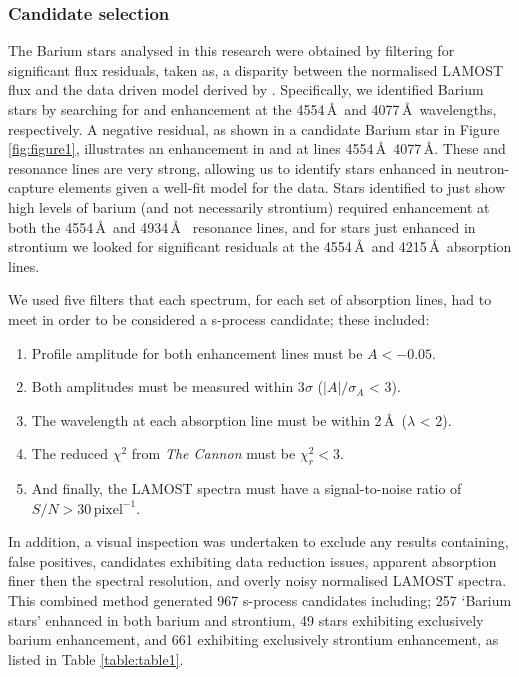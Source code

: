 \documentclass[a4paper,fleqn,usenatbib]{mnras}
\begin{document}
\subsubsection{Candidate selection} \label{sec:cand}
The Barium stars analysed in this research were obtained by filtering for significant flux residuals, taken as, a disparity between the normalised LAMOST flux and the data driven model derived by \citet{ho2017}. Specifically, we identified Barium stars by searching for  and  enhancement at the 4554\,\AA\ and 4077\,\AA\ wavelengths, respectively. A negative residual, as shown in a candidate Barium star in Figure \ref{fig:figure1}, illustrates an enhancement in  and  at lines 4554\,\AA\, 4077\,\AA. These  and  resonance lines are very strong, allowing us to identify stars enhanced in neutron-capture elements given a well-fit model for the data. Stars identified to just show high levels of barium (and not necessarily strontium) required enhancement at both the 4554\,\AA\ and 4934\,\AA\  resonance lines, and for stars just enhanced in strontium we looked for significant residuals at the 4554\,\AA\ and 4215\,\AA\ absorption lines.  

We used five filters that each spectrum, for each set of absorption lines, had to meet in order to be considered a s-process candidate; these included:

\renewcommand\labelenumi{(\roman{enumi})}
\renewcommand\theenumi\labelenumi

\begin{enumerate} 
\item Profile amplitude for both enhancement lines must be $A < -0.05$.
\item Both amplitudes must be measured within 3$\sigma$ ($|A|/\sigma _A$ < 3).
\item The wavelength at each absorption line must be within 2\,\AA\ ($\lambda$ < 2).
\item The reduced $\chi^2$ from \emph{The Cannon} must be $\chi_r^2 < 3$.
\item And finally, the LAMOST spectra must have a signal-to-noise ratio of $S/N > 30\,\textrm{pixel}^{-1}$.
\end{enumerate}
In addition, a visual inspection was undertaken to exclude any results containing, false positives, candidates exhibiting data reduction issues, apparent absorption finer then the spectral resolution, and overly noisy normalised LAMOST spectra. This combined method generated 967 s-process candidates including; 257 `Barium stars' enhanced in both barium and strontium, 49 stars exhibiting exclusively barium enhancement, and 661 exhibiting exclusively strontium enhancement, as listed in Table \ref{table:table1}. 
\end{document}
